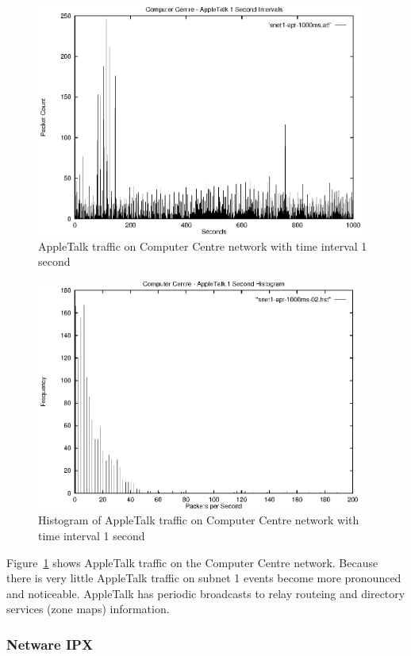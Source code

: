 \begin{figure}
\includegraphics[height=3in]{pics/snet1-apt-1s-freq.eps}
\caption{AppleTalk traffic on Computer Centre network with time interval 1 second}
\label{results:snet1.apt.1s.freq}
\end{figure}

\begin{figure}
\includegraphics[height=3in]{pics/snet1-apt-1s-hist-02.eps}
\caption{Histogram of AppleTalk traffic on Computer Centre network with time interval 1 second}
\label{results:snet1.apt.1s.hist}
\end{figure}

Figure~\ref{results:snet1.apt.1s.freq} shows AppleTalk traffic on the
Computer Centre network.  Because there is very little AppleTalk
traffic on subnet 1 events become more pronounced and noticeable.
AppleTalk has periodic broadcasts to relay routeing and directory
services (zone maps) information.

\subsubsection{Netware IPX}

